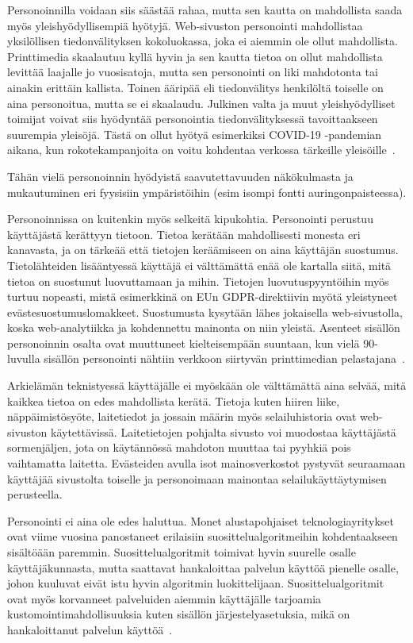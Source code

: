 \documentclass[finnish, 12pt, a4paper, elec, utf8, a-1b, online]{aaltothesis}
\begin{document}
Personoinnilla voidaan siis säästää rahaa, mutta sen kautta on mahdollista saada
myös yleishyödyllisempiä hyötyjä. Web-sivuston personointi mahdollistaa
yksilöllisen tiedonvälityksen kokoluokassa, joka ei aiemmin ole ollut
mahdollista. Printtimedia skaalautuu kyllä hyvin ja sen kautta tietoa on ollut
mahdollista levittää laajalle jo vuosisatoja, mutta sen personointi on liki
mahdotonta tai ainakin erittäin kallista. Toinen ääripää eli tiedonvälitys
henkilöltä toiselle on aina personoitua, mutta se ei skaalaudu. Julkinen valta
ja muut yleishyödylliset toimijat voivat siis hyödyntää personointia
tiedonvälityksessä tavoittaakseen suurempia yleisöjä. Tästä on ollut hyötyä
esimerkiksi COVID-19 -pandemian aikana, kun rokotekampanjoita on voitu kohdentaa
verkossa tärkeille yleisöille~\cite{viite?}.

Tähän vielä personoinnin hyödyistä saavutettavuuden näkökulmasta ja mukautuminen
eri fyysisiin ympäristöihin (esim isompi fontti auringonpaisteessa).

Personoinnissa on kuitenkin myös selkeitä kipukohtia. Personointi perustuu
käyttäjästä kerättyyn tietoon. Tietoa kerätään mahdollisesti monesta eri
kanavasta, ja on tärkeää että tietojen keräämiseen on aina käyttäjän suostumus.
Tietolähteiden lisääntyessä käyttäjä ei välttämättä enää ole kartalla siitä,
mitä tietoa on suostunut luovuttamaan ja mihin. Tietojen luovutuspyyntöihin myös
turtuu nopeasti, mistä esimerkkinä on EUn GDPR-direktiivin myötä yleistyneet
evästesuostumuslomakkeet. Suostumusta kysytään lähes jokaisella
web-sivustolla, koska web-analytiikka ja kohdennettu mainonta on niin
yleistä. Asenteet sisällön personoinnin osalta ovat muuttuneet kielteisempään
suuntaan, kun vielä 90-luvulla sisällön personointi nähtiin verkkoon siirtyvän
printtimedian pelastajana~\cite{adams_1995}.

Arkielämän teknistyessä käyttäjälle ei myöskään ole välttämättä aina selvää,
mitä kaikkea tietoa on edes mahdollista kerätä. Tietoja kuten hiiren liike,
näppäimistösyöte, laitetiedot ja jossain määrin myös selailuhistoria ovat
web-sivuston käytettävissä. Laitetietojen pohjalta sivusto voi muodostaa
käyttäjästä sormenjäljen, jota on käytännössä mahdoton muuttaa tai pyyhkiä pois
vaihtamatta laitetta. Evästeiden avulla isot mainosverkostot pystyvät seuraamaan
käyttäjää sivustolta toiselle ja personoimaan mainontaa selailukäyttäytymisen
perusteella.

Personointi ei aina ole edes haluttua. Monet alustapohjaiset teknologiayritykset
ovat viime vuosina panostaneet erilaisiin suosittelualgoritmeihin kohdentaakseen
sisältöään paremmin. Suosittelualgoritmit toimivat hyvin suurelle osalle
käyttäjäkunnasta, mutta saattavat hankaloittaa palvelun käyttöä pienelle osalle,
johon kuuluvat eivät istu hyvin algoritmin luokittelijaan. Suosittelualgoritmit
ovat myös korvanneet palveluiden aiemmin käyttäjälle tarjoamia
kustomointimahdollisuuksia kuten sisällön järjestelyasetuksia, mikä on
hankaloittanut palvelun käyttöä~\cite{patel_2022}.
\end{document}
